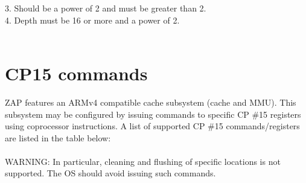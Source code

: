 \documentclass[10pt]{article}
\begin{document}
3. Should be a power of 2 and must be greater than 2. \\

4. Depth must be 16 or more and a power of 2. \\
\\

\section{CP15 commands}

ZAP features an ARMv4 compatible cache subsystem (cache and MMU). This subsystem 
may be configured by issuing commands to specific CP \#15 registers using 
coprocessor instructions. A list of supported CP \#15 commands/registers are 
listed in the table below:
\\
\\
WARNING: In particular, cleaning and flushing of specific locations is not 
supported. The OS should avoid issuing such commands.
\\
\\
\end{document}
